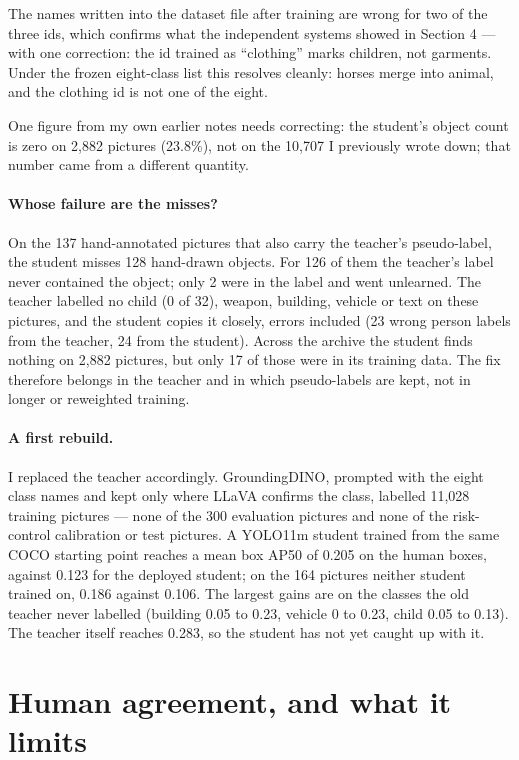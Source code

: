 \documentclass[11pt,a4paper]{article}
\begin{document}
The names written into the dataset file after training are wrong for two of the three ids, which
confirms what the independent systems showed in Section 4 --- with one correction: the id trained as
``clothing'' marks children, not garments. Under the frozen eight-class list this resolves cleanly:
horses merge into animal, and the clothing id is not one of the eight.

One figure from my own earlier notes needs correcting: the student's object count is zero on 2,882
pictures (23.8\%), not on the 10,707 I previously wrote down; that number came from a different
quantity.

\paragraph{Whose failure are the misses?} On the 137 hand-annotated pictures that also carry the
teacher's pseudo-label, the student misses 128 hand-drawn objects. For 126 of them the teacher's
label never contained the object; only 2 were in the label and went unlearned. The teacher labelled no
child (0 of 32), weapon, building, vehicle or text on these pictures, and the student copies it closely,
errors included (23 wrong person labels from the teacher, 24 from the student). Across the archive the
student finds nothing on 2,882 pictures, but only 17 of those were in its training data. The fix
therefore belongs in the teacher and in which pseudo-labels are kept, not in longer or reweighted
training.

\paragraph{A first rebuild.} I replaced the teacher accordingly. GroundingDINO, prompted with the eight
class names and kept only where LLaVA confirms the class, labelled 11,028 training pictures --- none of
the 300 evaluation pictures and none of the risk-control calibration or test pictures. A YOLO11m student
trained from the same COCO starting point reaches a mean box AP50 of 0.205 on the human boxes, against
0.123 for the deployed student; on the 164 pictures neither student trained on, 0.186 against 0.106.
The largest gains are on the classes the old teacher never labelled (building 0.05 to 0.23, vehicle 0 to
0.23, child 0.05 to 0.13). The teacher itself reaches 0.283, so the student has not yet caught up with
it.

\section{Human agreement, and what it limits}
\end{document}
